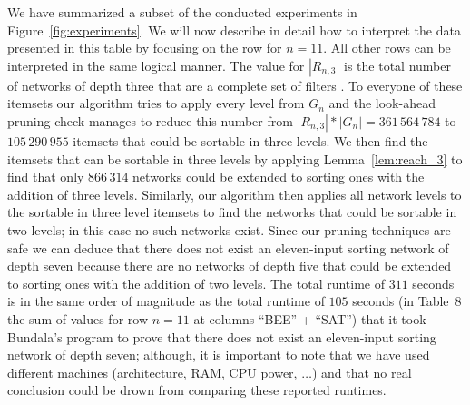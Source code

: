 \documentclass[13pt,a4paper]{article}
\begin{document}
We have summarized a subset of the conducted experiments in Figure~\ref{fig:experiments}. We will now describe in detail how to interpret the data presented in this table by focusing on the row for $n = 11$. All other rows can be interpreted in the same logical manner. The value for $|R_{n,3}|$ is the total number of networks of depth three that are a complete set of filters \cite{Marinov:SortingNetworks:ThirdLevel}. To everyone of these itemsets our algorithm tries to apply every level from $G_n$ and the look-ahead pruning check manages to reduce this number from $|R_{n,3}| * |G_n| = 361\,564\,784$ to $105\,290\,955$ itemsets that could be sortable in three levels. We then find the itemsets that can be sortable in three levels by applying Lemma~\ref{lem:reach_3} to find that only $866\,314$ networks could be extended to sorting ones with the addition of three levels. Similarly, our algorithm then applies all network levels to the sortable in three level itemsets to find the networks that could be sortable in two levels; in this case no such networks exist. Since our pruning techniques are safe we can deduce that there does not exist an eleven-input sorting network of depth seven because there are no networks of depth five that could be extended to sorting ones with the addition of two levels. The total runtime of $311$ seconds is in the same order of magnitude as the total runtime of $105$ seconds (in \cite{BundalaCCSZ14_Optimal_Depth} Table~8 the sum of values for row $n = 11$ at columns ``BEE'' + ``SAT'') that it took Bundala's program to prove that there does not exist an eleven-input sorting network of depth seven; although, it is important to note that we have used different machines (architecture, RAM, CPU power, $\dots$) and that no real conclusion could be drown from comparing these reported runtimes. 
\end{document}

